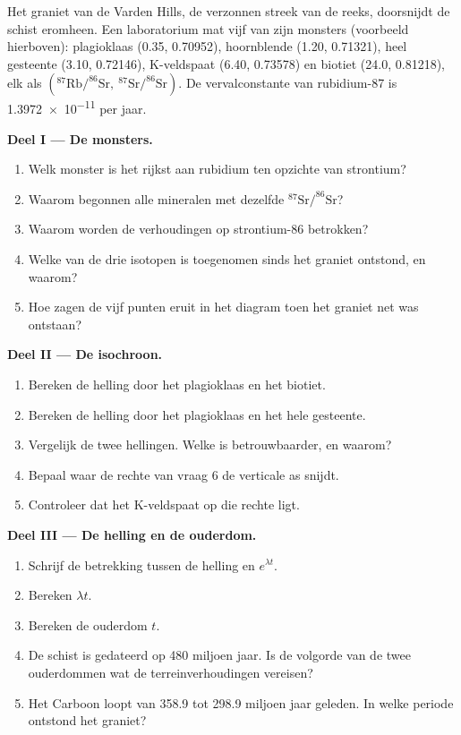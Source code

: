 \begin{problem}
\label{pb:g12:age-of-the-earth:1}
Het graniet van de Varden Hills, de verzonnen streek van de reeks, doorsnijdt de
schist eromheen. Een laboratorium mat vijf van zijn monsters (voorbeeld hierboven):
plagioklaas (0.35, 0.70952), hoornblende (1.20, 0.71321), heel gesteente (3.10,
0.72146), K-veldspaat (6.40, 0.73578) en biotiet (24.0, 0.81218), elk als
$(^{87}\mathrm{Rb}/^{86}\mathrm{Sr},\ ^{87}\mathrm{Sr}/^{86}\mathrm{Sr})$. De
vervalconstante van rubidium-87 is \num{1.3972e-11} per jaar.

\medskip
\noindent\textbf{Deel I --- De monsters.}
\begin{enumerate}
  \item Welk monster is het rijkst aan rubidium ten opzichte van strontium?
  \item Waarom begonnen alle mineralen met dezelfde
        $^{87}\mathrm{Sr}/^{86}\mathrm{Sr}$?
  \item Waarom worden de verhoudingen op strontium-86 betrokken?
  \item Welke van de drie isotopen is toegenomen sinds het graniet ontstond, en
        waarom?
  \item Hoe zagen de vijf punten eruit in het diagram toen het graniet
        net was ontstaan?
\end{enumerate}

\medskip
\noindent\textbf{Deel II --- De isochroon.}
\begin{enumerate}[resume]
  \item Bereken de helling door het plagioklaas en het biotiet.
  \item Bereken de helling door het plagioklaas en het hele gesteente.
  \item Vergelijk de twee hellingen. Welke is betrouwbaarder, en waarom?
  \item Bepaal waar de rechte van vraag 6 de verticale as snijdt.
  \item Controleer dat het K-veldspaat op die rechte ligt.
\end{enumerate}

\medskip
\noindent\textbf{Deel III --- De helling en de ouderdom.}
\begin{enumerate}[resume]
  \item Schrijf de betrekking tussen de helling en $e^{\lambda t}$.
  \item Bereken $\lambda t$.
  \item Bereken de ouderdom $t$.
  \item De schist is gedateerd op 480 miljoen jaar. Is de volgorde van de
        twee ouderdommen wat de terreinverhoudingen vereisen?
  \item Het Carboon loopt van 358.9 tot 298.9 miljoen jaar geleden. In
        welke periode ontstond het graniet?
\end{enumerate}


\end{problem}
